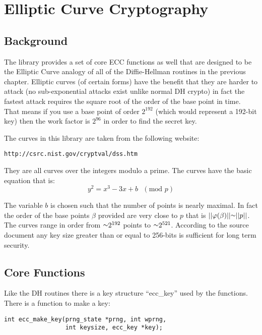 \documentclass{book}
\def\approx{\raisebox{0.2ex}{\mbox{\small $\sim$}}}
\def\phi{\varphi}
\begin{document}
\chapter{Elliptic Curve Cryptography}

\section{Background}
The library provides a set of core ECC functions as well that are designed to be the Elliptic Curve analogy of all of the 
Diffie-Hellman routines in the previous chapter.  Elliptic curves (of certain forms) have the benefit that they are harder
to attack (no sub-exponential attacks exist unlike normal DH crypto) in fact the fastest attack requires the square root
of the order of the base point in time.  That means if you use a base point of order $2^{192}$ (which would represent a
192-bit key) then the work factor is $2^{96}$ in order to find the secret key.

The curves in this library are taken from the following website:
\begin{verbatim}
http://csrc.nist.gov/cryptval/dss.htm
\end{verbatim}

They are all curves over the integers modulo a prime.  The curves have the basic equation that is:
\begin{equation}
y^2 = x^3 - 3x + b\mbox{ }(\mbox{mod }p)
\end{equation}

The variable $b$ is chosen such that the number of points is nearly maximal.  In fact the order of the base points $\beta$ 
provided are very close to $p$ that is $\vert \vert \phi(\beta) \vert \vert \approx \vert \vert p \vert \vert$.  The curves
range in order from $\approx 2^{192}$ points to $\approx 2^{521}$.  According to the source document any key size greater
than or equal to 256-bits is sufficient for long term security.  

\section{Core Functions}

Like the DH routines there is a key structure ``ecc\_key'' used by the functions.  There is a function to make a key:
\begin{verbatim}
int ecc_make_key(prng_state *prng, int wprng, 
                 int keysize, ecc_key *key);
\end{verbatim}
\end{document}
